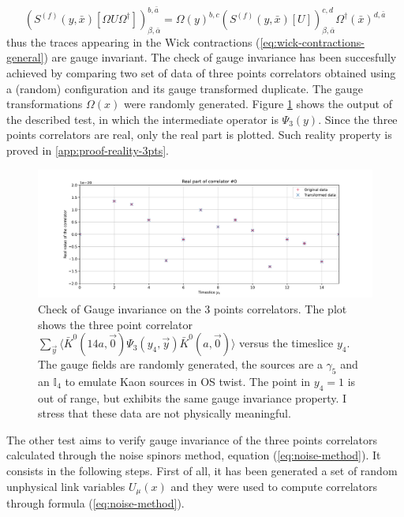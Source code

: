 \documentclass[english, LaM, oneside, noexaminfo]{sapthesis}
\newcommand{\la}{\langle}
\newcommand{\ra}{\rangle}
\begin{document}
\begin{equation*}
    \left(S^{(f)}(y, \bar x)[\Omega U \Omega^\dagger]\right)^{b,\bar a}_{\beta, \bar \alpha} = \Omega (y)^{b,c} \left(S^{(f)}(y, \bar x)[U]\right)^{c,d}_{\beta, \bar \alpha} \Omega^\dagger (\bar x)^{d,\bar a}
\end{equation*}
thus the traces appearing in the Wick contractions (\ref{eq:wick-contractions-general}) are gauge invariant.
The check of gauge invariance has been succesfully achieved by comparing two set of data of three points correlators obtained using a (random) configuration and its gauge transformed duplicate.
The gauge transformations $\Omega (x)$ were randomly generated.
Figure \ref{fig:check1} shows the output of the described test, in which the intermediate operator is $\Psi_3 (y)$.
Since the three points correlators are real, only the real part is plotted.
Such reality property is proved in \ref{app:proof-reality-3pts}.
\begin{figure}[h!]
    \centering
    \includegraphics[width=\textwidth]{imgs-MSc-thesis/check1.pdf}
    \caption{Check of Gauge invariance on the 3 points correlators.
        The plot shows the three point correlator $\sum_{\vec y} \la \bar K^0 (14a,\vec 0) \Psi_3 (y_4, \vec y) \bar K^0 (a,\vec 0) \ra$ versus the timeslice $y_4$.
        The gauge fields are randomly generated, the sources are a $\gamma_5$ and an $\mathbb{I}_4$ to emulate Kaon sources in OS twist.
        The point in $y_4=1$ is out of range, but exhibits the same gauge invariance property.
        I stress that these data are not physically meaningful.}
    \label{fig:check1}
\end{figure}
\newline
The other test aims to verify gauge invariance of the three points correlators calculated through the noise spinors method, equation (\ref{eq:noise-method}).
It consists in the following steps.
First of all, it has been generated a set of random unphysical link variables $U_\mu (x)$ and they were used to compute correlators through formula (\ref{eq:noise-method}).
\end{document}
